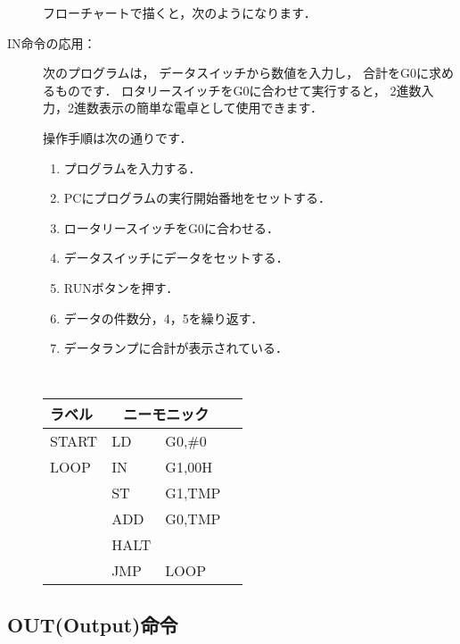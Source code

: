 \begin{description}
フローチャートで描くと，次のようになります．

\begin{center}
\epsfxsize=3.8cm
\end{center}


\item[IN命令の応用：]
次のプログラムは，
データスイッチから数値を入力し，
合計をG0に求めるものです．
ロタリースイッチをG0に合わせて実行すると，
2進数入力，2進数表示の簡単な電卓として使用できます．

操作手順は次の通りです．

\begin{enumerate}
\item プログラムを入力する．
\item PCにプログラムの実行開始番地をセットする．
\item ロータリースイッチをG0に合わせる．
\item データスイッチにデータをセットする．
\item RUNボタンを押す．
\item データの件数分，4，5を繰り返す．
\item データランプに合計が表示されている．
\end{enumerate}

\begin{center}
{\tt 
\begin{tabular}{|l|l l|l}
\cline{1-3}
ラベル & \multicolumn{2}{|c|}{ニーモニック} \\
\hline
START & LD   & G0,\#0        \\
LOOP  & IN   & G1,00H        \\
      & ST   & G1,TMP        \\
      & ADD  & G0,TMP        \\
      & HALT &               \\
      & JMP  & LOOP          \\ 
\hline
\end{tabular}
}
\end{center}

\end{description}

\newpage
\subsection{OUT(Output)命令}
\label{out}

